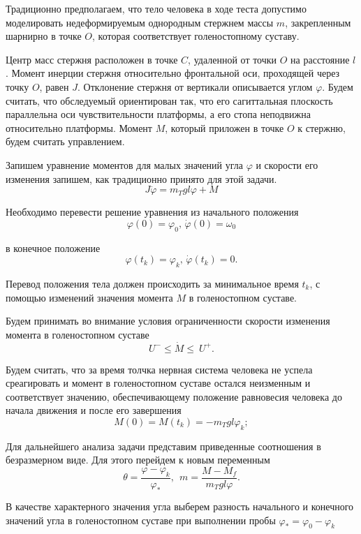 \documentclass[a4paper,14pt]{article}
\theoremstyle{plain} %
\theoremstyle{definition} %
\theoremstyle{remark} %
\begin{document}
{Традиционно предполагаем, что тело человека в ходе теста допустимо
моделировать недеформируемым однородным стержнем массы $m$,
закрепленным шарнирно в точке $O$, которая соответствует
голеностопному суставу.

Центр масс стержня расположен в точке $C$, удаленной от точки $O$
на расстояние $l$. Момент инерции стержня относительно фронтальной
оси, проходящей через точку $O$, равен $J$. Отклонение стержня от
вертикали описывается углом $\varphi$. Будем считать, что обследуемый
ориентирован так, что его сагиттальная плоскость параллельна оси
чувствительности платформы, а его стопа неподвижна относительно
платформы. Момент $M$, который приложен в точке $O$ к стержню,
будем считать управлением.

Запишем уравнение моментов для малых значений угла $\varphi$ и
скорости его изменения запишем, как традиционно принято для этой задачи.
\begin{equation}\label{6}
    J\ddot{\varphi}= m_Tgl\varphi+M
\end{equation}

Необходимо перевести решение уравнения из начального положения
\begin{equation}\label{7}
    \varphi(0)=\varphi_0, \,\dot{\varphi}(0)=\omega_0
\end{equation}

в конечное положение
\begin{equation}\label{8}
    \varphi(t_k)=\varphi_k,\, \dot{\varphi}(t_k)=0.
\end{equation}

Перевод положения тела должен происходить за минимальное
время $t_k$, с помощью изменений значения момента $M$ в
голеностопном суставе.

Будем принимать во внимание условия ограниченности скорости изменения
момента в голеностопном суставе
\[
    U^-\le\dot{M}\le\ U^+.
\]

Будем считать, что за время толчка нервная система человека
не успела среагировать и момент в голеностопном суставе остался
неизменным и соответствует значению, обеспечивающему положение
равновесия человека до начала движения и после его завершения
\[
    M(0)=M\left(t_k\right)=-m_Tgl\varphi_k;
\]

Для дальнейшего анализа задачи представим приведенные
соотношения в безразмерном виде. Для этого перейдем
к новым переменным
\[
    \theta=\frac{\varphi-\varphi_k}{\varphi_\ast},\ \ m=\frac{M-M_f}{m_Tgl\varphi}.
\]

В качестве характерного значения угла выберем разность
начального и конечного значений угла в голеностопном
суставе при выполнении пробы $\varphi_\ast=\varphi_0-\varphi_k$

}
\end{document}
